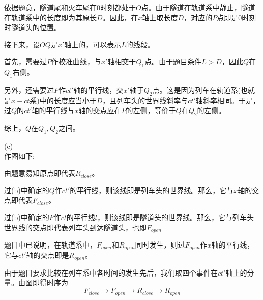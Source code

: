 \begin{solution}
    依据题意，隧道尾和火车尾在$0$时刻都处于$O$点。由于隧道在轨道系中静止，隧道在轨道系中的长度即为其原长$D$。因此，在$x$轴上取长度$D$，对应的$P$点即是$0$时刻时隧道头的位置。
    
    接下来，设$OQ$是$x'$轴上的，可以表示$L$的线段。
    
    首先，需要过$P$作校准曲线，与$x'$轴相交于$Q_1$点。由于题目条件$L>D$，因此$Q$在$Q_1$右侧。
    
    另外，还需要过$P$作$ct'$轴的平行线，交$x'$轴于$Q_2$点。这是因为列车在轨道系(也就是$x-ct$系)中的长度应当小于$D$，且列车头的世界线斜率与$ct'$轴斜率相同。于是，过$Q$的$ct'$轴的平行线与$x$轴的交点应在$P$的左侧，等价于$Q$在$Q_2$的左侧。
    
    综上，$Q$在$Q_1,Q_2$之间。
    
    (c)\\
    作图如下:
    \begin{center}
    \end{center}
    
    由题意易知原点即代表$R_{close}$。
    
    过(b)中确定的$Q$作$ct'$的平行线，则该线即是列车头的世界线。那么，它与$x$轴的交点即代表$F_{close}$。
    
    过(b)中确定的$P$作$ct$的平行线$l$，则该线即是隧道头的世界线。那么，它与列车头世界线的交点即代表列车头到达隧道头，也即$F_{open}$
    
    题目中已说明，在轨道系中，$F_{open}$和$R_{open}$同时发生，则过$F_{open}$作$x$轴的平行线，它与$ct'$轴的交点即是$R_{open}$。
    
    由于题目要求比较在列车系中各时间的发生先后，我们取四个事件在$ct'$轴上的分量。由图即得时序为
    \[F_{close}\rightarrow F_{open}\rightarrow R_{close}\rightarrow R_{open}\]
\end{solution}

